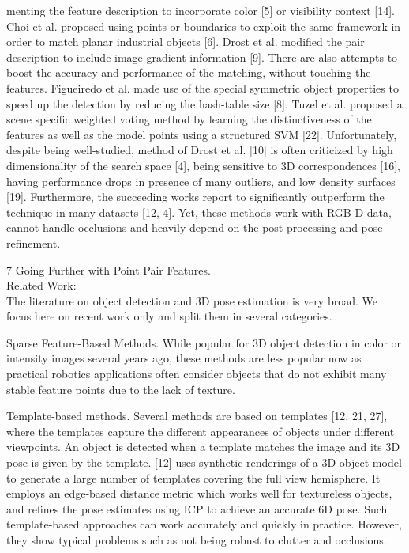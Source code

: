 \documentclass[10]{article}
\begin{document}
menting the feature description to incorporate color [5] or visibility context [14]. Choi et al. proposed using points or boundaries to exploit the same framework in order to match planar industrial objects [6]. Drost et al. modified the pair description to include image gradient information [9]. There are also attempts to boost the accuracy and performance of the matching, without touching the features. Figueiredo et al. made use of the special symmetric object properties to speed up the detection by reducing the hash-table size [8]. Tuzel et al. proposed a scene specific weighted voting method by learning the distinctiveness of the features as well as the model points using a structured SVM [22]. Unfortunately, despite being well-studied, method of Drost et al. [10] is often criticized by high dimensionality of the search space [4], being sensitive to 3D correspondences [16], having performance drops in presence of many outliers, and low density surfaces [19]. Furthermore, the succeeding works report to significantly outperform the technique in
many datasets [12, 4]. Yet, these methods work with RGB-D data, cannot handle occlusions and heavily depend on the post-processing and pose refinement.



7 Going Further with Point Pair Features.\\

Related Work:\\

The literature on object detection and 3D pose estimation is very broad. We focus here on recent work only and split them in several categories.

 Sparse Feature-Based Methods. While popular for 3D object detection in color or intensity images several years ago, these methods are less popular now as practical robotics applications often consider objects that do not exhibit many stable feature points due to the lack of texture. 

Template-based methods. Several methods are based on templates [12, 21, 27], where the templates capture the different appearances of objects under different viewpoints. An object is detected when a template matches the image and its 3D pose is given by the template. [12] uses synthetic renderings of a 3D object model to generate a large number of templates covering the full view hemisphere. It employs an edge-based distance metric which works well for textureless objects, and refines the pose estimates using ICP to achieve an accurate 6D pose. Such template-based approaches can work accurately and quickly in practice. However, they show typical problems such as not being robust to clutter and occlusions.
\end{document}
